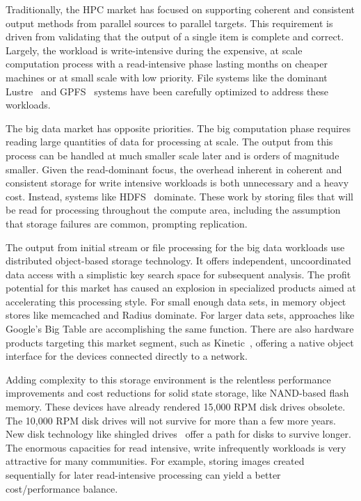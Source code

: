 Traditionally, the HPC market has focused on supporting coherent and consistent
output methods from parallel sources to parallel targets. This requirement is
driven from validating that the output of a single item is complete and
correct. Largely, the workload is write-intensive during the expensive, at scale
computation process with a read-intensive phase lasting months on cheaper
machines or at small scale with low priority. File systems like the dominant
Lustre~\cite{braam:2002:lustre-arch} and GPFS~\cite{schmuck:2002:gpfs} systems
have been carefully optimized to address these workloads.

The big data market has opposite priorities. The big computation phase requires
reading large quantities of data for processing at scale. The output from this
process can be handled at much smaller scale later and is orders of magnitude
smaller. Given the read-dominant focus, the overhead inherent in coherent and
consistent storage for write intensive workloads is both unnecessary and a heavy
cost. Instead, systems like HDFS~\cite{shvachko:2010:hdfs} dominate.  These work
by storing files that will be read for processing throughout the compute area,
including the assumption that storage failures are common, prompting
replication.

The output from initial stream or file processing for the big data workloads use
distributed object-based storage technology. It offers independent,
uncoordinated data access with a simplistic key search space for subsequent
analysis. The profit potential for this market has caused an explosion in
specialized products aimed at accelerating this processing style.  For small
enough data sets, in memory object stores like memcached and Radius dominate.
For larger data sets, approaches like Google's Big Table are accomplishing the
same function. There are also hardware products targeting this market segment,
such as Kinetic~\cite{segate-kinetic}, offering a native object interface for
the devices connected directly to a network.

Adding complexity to this storage environment is the relentless performance
improvements and cost reductions for solid state storage, like NAND-based flash
memory. These devices have already rendered 15,000 RPM disk drives obsolete.
The 10,000 RPM disk drives will not survive for more than a few more years.
New disk technology like shingled drives~\cite{wood:2009:shingled-media} offer
a path for disks to survive longer. The enormous capacities for read intensive,
write infrequently workloads is very attractive for many communities. For
example, storing images created sequentially for later read-intensive
processing can yield a better cost/performance balance.

